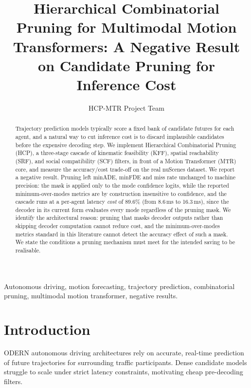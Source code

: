 \documentclass[10pt,journal,compsoc]{IEEEtran}
\begin{document}
\title{Hierarchical Combinatorial Pruning for Multimodal Motion Transformers:
A Negative Result on Candidate Pruning for Inference Cost}

\author{HCP-MTR Project Team}

\maketitle

\begin{abstract}
Trajectory prediction models typically score a fixed bank of candidate futures
for each agent, and a natural way to cut inference cost is to discard
implausible candidates before the expensive decoding step. We implement
Hierarchical Combinatorial Pruning (HCP), a three-stage cascade of kinematic
feasibility (KFF), spatial reachability (SRF), and social compatibility (SCF)
filters, in front of a Motion Transformer (MTR) core, and measure the
accuracy/cost trade-off on the real nuScenes dataset. We report a negative
result. Pruning left minADE, minFDE and miss rate unchanged to machine precision: the mask is applied only to the mode confidence logits, while the reported minimum-over-modes metrics are by construction insensitive to confidence, and the cascade runs at a per-agent latency \emph{cost} of 89.6\% (from 8.6\,ms to 16.3\,ms), since the decoder in its current form evaluates every mode regardless of the pruning mask.
We identify the architectural reason: pruning that masks decoder outputs rather
than skipping decoder computation cannot reduce cost, and the
minimum-over-modes metrics standard in this literature cannot detect the
accuracy effect of such a mask. We state the conditions a pruning mechanism
must meet for the intended saving to be realisable.
\end{abstract}

\begin{IEEEkeywords}
Autonomous driving, motion forecasting, trajectory prediction, combinatorial
pruning, multimodal motion transformer, negative results.
\end{IEEEkeywords}

\section{Introduction}
ODERN autonomous driving architectures rely on accurate,
real-time prediction of future trajectories for surrounding traffic
participants. Dense candidate models struggle to scale under strict latency
constraints, motivating cheap pre-decoding filters.
\end{document}

